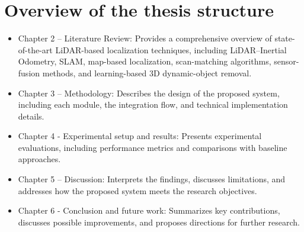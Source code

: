 \section{Overview of the thesis structure}
\begin{itemize}
    \item Chapter 2 – Literature Review: Provides a comprehensive overview of state-of-the-art LiDAR-based localization techniques, including LiDAR–Inertial Odometry, SLAM, map-based localization, scan-matching algorithms, sensor-fusion methods, and learning-based 3D dynamic-object removal.
    
    \item Chapter 3 – Methodology: Describes the design of the proposed system, including each module, the integration flow, and technical implementation details.
 	   \item Chapter 4 - Experimental setup and results: Presents experimental evaluations, including performance metrics and comparisons with baseline approaches.
    \item Chapter 5 – Discussion: Interprets the findings, discusses limitations, and addresses how the proposed system meets the research objectives.
    \item Chapter 6 - Conclusion and future work: Summarizes key contributions, discusses possible improvements, and proposes directions for further research.
\end{itemize}





